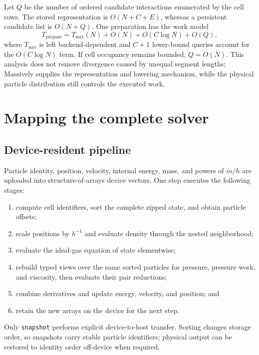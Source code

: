 \documentclass[a4paper,10pt]{article}
\newcommand{\code}[1]{\texttt{#1}}
\begin{document}
Let $Q$ be the number of ordered candidate interactions enumerated by the cell
rows.  The stored representation is $O(N+C+E)$, whereas a persistent candidate
list is $O(N+Q)$.  One preparation has the work model
\begin{equation}
 T_{\mathrm{prepare}}=
 T_{\mathrm{sort}}(N)+O(N)+O(C\log N)+O(Q),
 \label{eq:cost}
\end{equation}
where $T_{\mathrm{sort}}$ is left backend-dependent and $C+1$ lower-bound
queries account for the $O(C\log N)$ term.  If cell occupancy remains bounded,
$Q=O(N)$.  This analysis does not remove divergence caused by unequal segment
lengths; Massively supplies the representation and lowering mechanism, while
the physical particle distribution still controls the executed work.

\section{Mapping the complete solver}
\label{sec:whole-solver}

\subsection{Device-resident pipeline}

Particle identity, position, velocity, internal energy, mass, and powers of
$m/h$ are uploaded into structure-of-arrays device vectors.  One step executes
the following stages:
\begin{enumerate}
  \item compute cell identifiers, sort the complete zipped state, and obtain
        particle offsets;
  \item scale positions by $h^{-1}$ and evaluate density through the nested
        neighborhood;
  \item evaluate the ideal-gas equation of state elementwise;
  \item rebuild typed views over the same sorted particles for pressure, pressure
        work, and viscosity, then evaluate their pair reductions;
  \item combine derivatives and update energy, velocity, and position; and
  \item retain the new arrays on the device for the next step.
\end{enumerate}
Only \code{snapshot} performs explicit device-to-host transfer.  Sorting changes
storage order, so snapshots carry stable particle identifiers; physical output
can be restored to identity order off-device when required.
\end{document}
